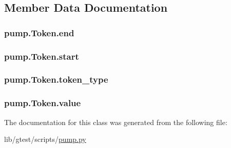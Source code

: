 \subsection{Member Data Documentation}
\hypertarget{classpump_1_1_token_abb88c0ece4274cfd974fd01d0468953c}{
\subsubsection[{end}]{\setlength{\rightskip}{0pt plus 5cm}pump.\-Token.\-end}}\label{classpump_1_1_token_abb88c0ece4274cfd974fd01d0468953c}
\hypertarget{classpump_1_1_token_a53e3333a770bc8773224a5af78bca5bb}{
\subsubsection[{start}]{\setlength{\rightskip}{0pt plus 5cm}pump.\-Token.\-start}}\label{classpump_1_1_token_a53e3333a770bc8773224a5af78bca5bb}
\hypertarget{classpump_1_1_token_aeac105b76f6af13c8c64ba0a94e37d90}{
\subsubsection[{token\-\_\-type}]{\setlength{\rightskip}{0pt plus 5cm}pump.\-Token.\-token\-\_\-type}}\label{classpump_1_1_token_aeac105b76f6af13c8c64ba0a94e37d90}
\hypertarget{classpump_1_1_token_a5b7ab395a380b775b2bf0a8b0abfda86}{
\subsubsection[{value}]{\setlength{\rightskip}{0pt plus 5cm}pump.\-Token.\-value}}\label{classpump_1_1_token_a5b7ab395a380b775b2bf0a8b0abfda86}


The documentation for this class was generated from the following file\-:\begin{DoxyCompactItemize}
\item 
lib/gtest/scripts/\hyperlink{pump_8py}{pump.\-py}\end{DoxyCompactItemize}

